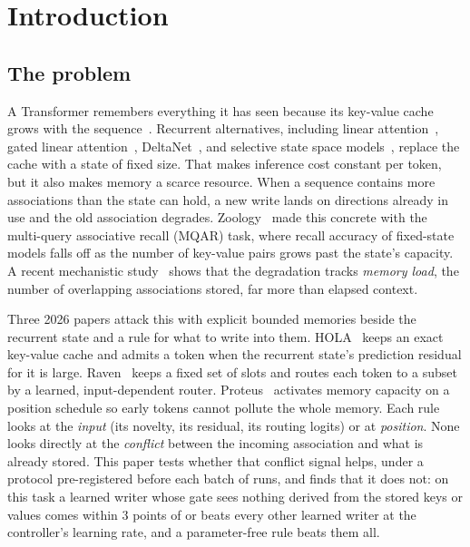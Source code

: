 \documentclass[conference]{IEEEtran}
\begin{document}
\section{Introduction}
\label{sec:intro}

\subsection{The problem}

A Transformer remembers everything it has seen because its key-value cache grows
with the sequence~\cite{vaswani2017attention}. Recurrent alternatives, including
linear attention~\cite{katharopoulos2020linear}, gated linear
attention~\cite{yang2023gla}, DeltaNet~\cite{yang2024deltanet}, and selective
state space models~\cite{gu2023mamba}, replace the cache with a state of fixed
size. That makes inference cost constant per token, but it also makes memory a
scarce resource. When a sequence contains more associations than the state can
hold, a new write lands on directions already in use and the old association
degrades. Zoology~\cite{arora2023zoology} made this concrete with the multi-query
associative recall (MQAR) task, where recall accuracy of fixed-state models falls
off as the number of key-value pairs grows past the state's capacity. A recent
mechanistic study~\cite{lee2026howlinear} shows that the degradation tracks
\emph{memory load}, the number of overlapping associations stored, far more than
elapsed context.

Three 2026 papers attack this with explicit bounded memories beside the recurrent
state and a rule for what to write into them. HOLA~\cite{cui2026hola} keeps an
exact key-value cache and admits a token when the recurrent state's prediction
residual for it is large. Raven~\cite{afzal2026raven} keeps a fixed set of slots
and routes each token to a subset by a learned, input-dependent router.
Proteus~\cite{bayat2026proteus} activates memory capacity on a position schedule
so early tokens cannot pollute the whole memory. Each rule looks at the
\emph{input} (its novelty, its residual, its routing logits) or at
\emph{position}. None looks directly at the \emph{conflict} between the incoming
association and what is already stored. This paper tests whether that conflict
signal helps, under a protocol pre-registered before each batch of runs, and
finds that it does not: on this task a learned writer whose gate sees nothing
derived from the stored keys or values comes within 3 points of or beats
every other learned writer at the controller's learning rate, and a
parameter-free rule beats them all.
\end{document}

